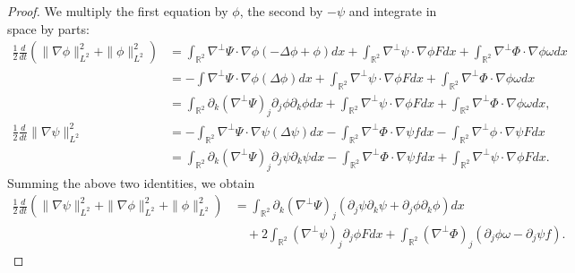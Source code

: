 \documentclass[11pt,reqno]{amsproc}
\newcommand{\pa}{\partial}
\newcommand{\na}{\nabla}
\newcommand{\R}{\mathbb{R}}
\begin{document}
\begin{proof}
We multiply the first equation by $\phi$, the second by $-\psi$ and integrate in space by parts:
\begin{align*}
    \frac12 \frac{d}{dt} \left(\|\na\phi\|_{L^2}^2 + \|\phi\|_{L^2}^2\right) &= \int_{\R^2} \nabla^\perp \Psi \cdot \na\phi (-\Delta\phi + \phi) dx + \int_{\R^2} \na^\perp \psi \cdot \na \phi F dx + \int_{\R^2} \na^\perp \Phi \cdot \na\phi \omega dx\\
    &= -\int \na^\perp \Psi \cdot \na\phi(\Delta\phi) dx +\int_{\R^2} \na^\perp \psi \cdot \na \phi F dx + \int_{\R^2} \na^\perp \Phi \cdot \na\phi \omega dx\\
    &= \int_{\R^2} \pa_k (\na^\perp\Psi)_j\pa_j\phi \pa_k\phi dx +\int_{\R^2} \na^\perp \psi \cdot \na \phi F dx + \int_{\R^2} \na^\perp \Phi \cdot \na\phi \omega dx,\\
    \frac12\frac{d}{dt} \|\na \psi\|_{L^2}^2 &= -\int_{\R^2} \na^\perp \Psi \cdot \na \psi (\Delta \psi) dx -\int_{\R^2} \na^\perp \Phi \cdot \na\psi f dx-\int_{\R^2}\na^\perp \phi \cdot \na \psi F dx\\
    &=\int_{\R^2} \pa_k (\na^\perp\Psi)_j\pa_j\psi \pa_k\psi dx-\int_{\R^2} \na^\perp \Phi \cdot \na\psi f dx+\int_{\R^2}\na^\perp \psi \cdot \na \phi F dx.
\end{align*}
Summing the above two identities, we obtain
\begin{equation}
    \label{sumenergy}
    \begin{split}
    \frac12 \frac{d}{dt}\left(\|\na \psi\|_{L^2}^2+\|\na\phi\|_{L^2}^2 + \|\phi\|_{L^2}^2\right) &= \int_{\R^2} \pa_k (\na^\perp\Psi)_j (\pa_j\psi \pa_k\psi + \pa_j\phi \pa_k\phi) dx \\
    &\quad+ 2\int_{\R^2}(\na^\perp \psi)_j \pa_j \phi F dx + \int_{\R^2} (\na^\perp \Phi)_j (\pa_j\phi \omega - \pa_j\psi f).
    \end{split}
\end{equation}


\end{proof}
\end{document}
